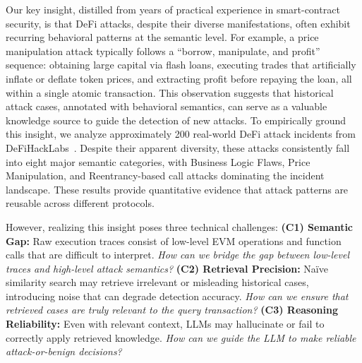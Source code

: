 Our key insight, distilled from years of practical experience in smart-contract security, is that DeFi attacks, despite their diverse manifestations, often exhibit recurring behavioral patterns at the semantic level. For example, a price manipulation attack typically follows a ``borrow, manipulate, and profit'' sequence: obtaining large capital via flash loans, executing trades that artificially inflate or deflate token prices, and extracting profit before repaying the loan, all within a single atomic transaction. This observation suggests that historical attack cases, annotated with behavioral semantics, can serve as a valuable knowledge source to guide the detection of new attacks. 
To empirically ground this insight, we analyze approximately 200 real-world DeFi attack incidents from DeFiHackLabs~\cite{defihacklabs2024}.
Despite their apparent diversity, these attacks consistently fall into eight major semantic categories, with Business Logic Flaws, Price Manipulation, and Reentrancy-based call attacks dominating the incident landscape.
These results provide quantitative evidence that attack patterns are reusable across different protocols.

However, realizing this insight poses three technical challenges: \textbf{(C1) Semantic Gap:} Raw execution traces consist of low-level EVM operations and function calls that are difficult to interpret. \textit{How can we bridge the gap between low-level traces and high-level attack semantics?} \textbf{(C2) Retrieval Precision:} Na\"ive similarity search may retrieve irrelevant or misleading historical cases, introducing noise that can degrade detection accuracy. \textit{How can we ensure that retrieved cases are truly relevant to the query transaction?} \textbf{(C3) Reasoning Reliability:} Even with relevant context, LLMs may hallucinate or fail to correctly apply retrieved knowledge. \textit{How can we guide the LLM to make reliable attack-or-benign decisions?}

